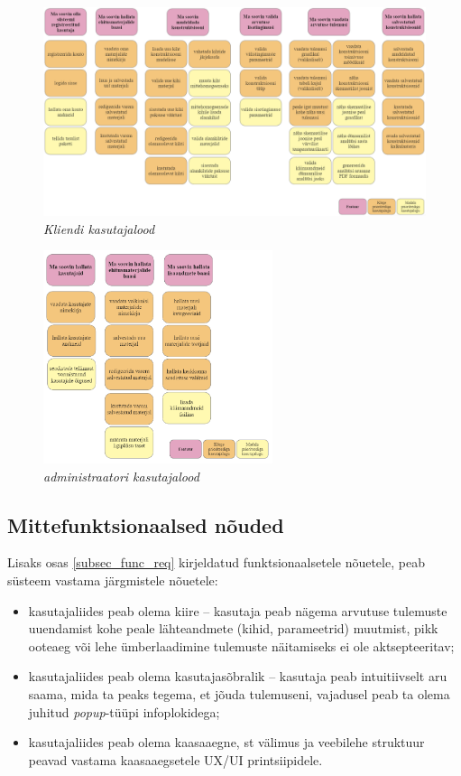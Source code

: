\begin{figure}[ht]
    \centering
    \includegraphics[width=1\textwidth]{figures/analysis/client_userstories.png}
    \caption[Funktsionaalsed nõuded, kliendi kasutajalood]{\textit{Kliendi kasutajalood}}
    \label{fig:client_userstories}
\end{figure}

\begin{figure}[ht]
    \centering
    \includegraphics[width=0.6\textwidth]{figures/analysis/admin_userstories.png}
    \caption[Funktsionaalsed nõuded, administraatori kasutajalood]{\textit{administraatori kasutajalood}}
    \label{fig:admin_userstories}
\end{figure}

\subsection{Mittefunktsionaalsed nõuded}
Lisaks osas \ref{subsec_func_req} kirjeldatud funktsionaalsetele nõuetele, peab süsteem vastama järgmistele nõuetele:
\begin{itemize}
    \item kasutajaliides peab olema kiire -- kasutaja peab nägema arvutuse tulemuste uuendamist kohe peale 
lähteandmete (kihid, parameetrid) muutmist, pikk ooteaeg või lehe ümberlaadimine tulemuste näitamiseks ei ole aktsepteeritav;
    \item kasutajaliides peab olema kasutajasõbralik -- kasutaja peab intuitiivselt aru saama, mida ta peaks tegema, et 
jõuda tulemuseni, vajadusel peab ta olema juhitud \textit{popup}-tüüpi infoplokidega;
    \item kasutajaliides peab olema kaasaaegne, st välimus ja veebilehe struktuur peavad
vastama kaasaaegsetele UX/UI printsiipidele.
\end{itemize}
